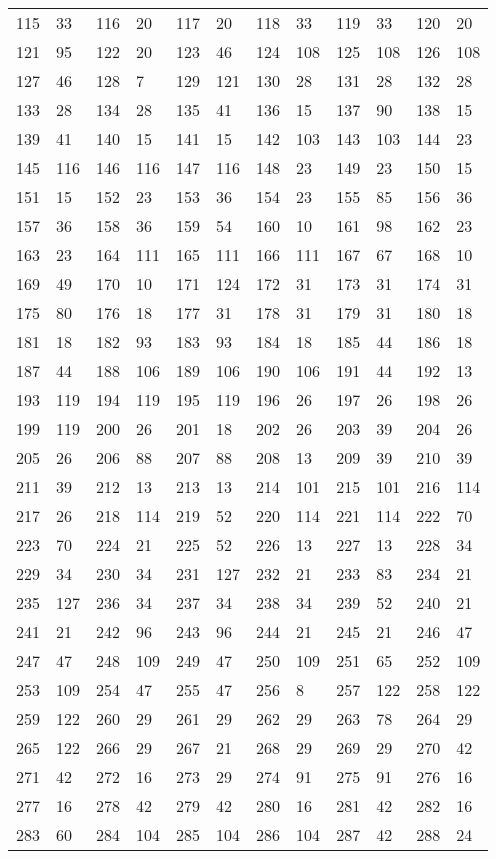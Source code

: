 \begin{longtable}{llllllllllll}
115 & 33&116 &20&117& 20&118 &33&119 &33&120& 20\\
121 & 95&122 &20&123& 46&124 &108&125 &108&126& 108\\
127 & 46&128 &7&129& 121&130 &28&131 &28&132& 28\\
133 & 28&134 &28&135& 41&136 &15&137 &90&138& 15\\
139 & 41&140 &15&141& 15&142 &103&143 &103&144& 23\\
145 & 116&146 &116&147& 116&148 &23&149 &23&150& 15\\
151 & 15&152 &23&153& 36&154 &23&155 &85&156& 36\\
157 & 36&158 &36&159& 54&160 &10&161 &98&162& 23\\
163 & 23&164 &111&165& 111&166 &111&167 &67&168& 10\\
169 & 49&170 &10&171& 124&172 &31&173 &31&174& 31\\
175 & 80&176 &18&177& 31&178 &31&179 &31&180& 18\\
181 & 18&182 &93&183& 93&184 &18&185 &44&186& 18\\
187 & 44&188 &106&189& 106&190 &106&191 &44&192& 13\\
193 & 119&194 &119&195& 119&196 &26&197 &26&198& 26\\
199 & 119&200 &26&201& 18&202 &26&203 &39&204& 26\\
205 & 26&206 &88&207& 88&208 &13&209 &39&210& 39\\
211 & 39&212 &13&213& 13&214 &101&215 &101&216& 114\\
217 & 26&218 &114&219& 52&220 &114&221 &114&222& 70\\
223 & 70&224 &21&225& 52&226 &13&227 &13&228& 34\\
229 & 34&230 &34&231& 127&232 &21&233 &83&234& 21\\
235 & 127&236 &34&237& 34&238 &34&239 &52&240& 21\\
241 & 21&242 &96&243& 96&244 &21&245 &21&246& 47\\
247 & 47&248 &109&249& 47&250 &109&251 &65&252& 109\\
253 & 109&254 &47&255& 47&256 &8&257 &122&258& 122\\
259 & 122&260 &29&261& 29&262 &29&263 &78&264& 29\\
265 & 122&266 &29&267& 21&268 &29&269 &29&270& 42\\
271 & 42&272 &16&273& 29&274 &91&275 &91&276& 16\\
277 & 16&278 &42&279& 42&280 &16&281 &42&282& 16\\
283 & 60&284 &104&285& 104&286 &104&287 &42&288& 24\\

\end{longtable}
